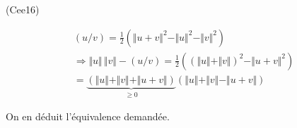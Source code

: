 \begin{tiny}(Cee16)\end{tiny}
\begin{multline*}
 (u/v)=\frac{1}{2}\left(\Vert u+v \Vert^2 -\Vert u \Vert^2 -\Vert v \Vert^2  \right) \\
\Rightarrow
\Vert u \Vert\, \Vert v \Vert -(u/v) 
=\frac{1}{2}\left( (\Vert u \Vert + \Vert v \Vert)^2-\Vert u + v \Vert^2\right)\\
=\underset{\geq 0}{\underbrace{\left(\Vert u \Vert + \Vert v \Vert +\Vert u + v \Vert \right)}}
\left(\Vert u \Vert + \Vert v \Vert -\Vert u + v \Vert \right)
\end{multline*}

On en déduit l'équivalence demandée.
